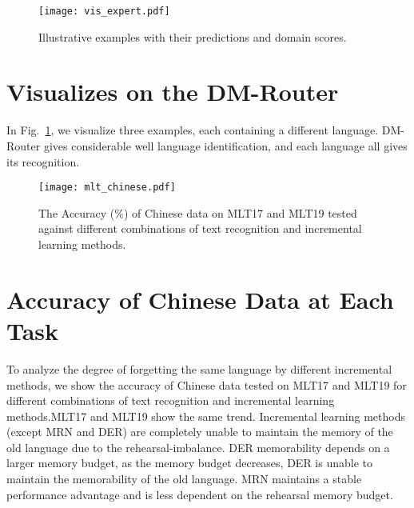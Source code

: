 \documentclass[10pt,twocolumn,letterpaper]{article}
\begin{document}
\begin{figure}[htb]
\centering
\texttt{[image: vis\_expert.pdf]} \caption{Illustrative examples with their predictions and domain scores.}
\label{fig:expert_vis}
\end{figure}
\section{Visualizes on the DM-Router}
In Fig.~\ref{fig:expert_vis}, we visualize three examples, each containing a different language. DM-Router gives considerable well language identification, and each language all gives its recognition.

\begin{figure*}[thbp]
\centering
\texttt{[image: mlt\_chinese.pdf]} \caption{The Accuracy (\%) of Chinese data on MLT17 and MLT19 tested against different combinations of text recognition and incremental learning methods.}
\label{fig:chinese acc}
\end{figure*}
\section{Accuracy of Chinese Data at Each Task}

To analyze the degree of forgetting the same language by different incremental methods, we show the accuracy of Chinese data tested on MLT17 and MLT19 for different combinations of text recognition and incremental learning methods.MLT17 and MLT19 show the same trend. Incremental learning methods (except MRN and DER) are completely unable to maintain the memory of the old language due to the rehearsal-imbalance. DER memorability depends on a larger memory budget, as the memory budget decreases, DER is unable to maintain the memorability of the old language. MRN maintains a stable performance advantage and is less dependent on the rehearsal memory budget.
\end{document}
